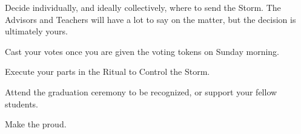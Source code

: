 \documentclass[blue]{GL2020}
\begin{document}
\begin{itemz}[Goals]
	\item Decide individually, and ideally collectively, where to send the Storm. The Advisors and Teachers will have a lot to say on the matter, but the decision is ultimately yours.
	\item Cast your votes once you are given the voting tokens on Sunday morning.
	\item Execute your parts in the Ritual to Control the Storm.
	\item Attend the graduation ceremony to be recognized, or support your fellow students.
	\item Make the \pSc{} proud.
\end{itemz}
\end{document}
